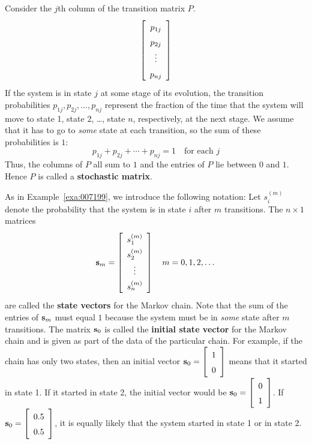 Consider the $j$th column of the transition matrix $P$.
\begin{equation*}
\leftB \begin{array}{c}
p_{1j} \\
p_{2j} \\
\vdots \\
p_{nj}
\end{array} \rightB
\end{equation*}
If the system is in state $j$ at some stage of its evolution, the transition probabilities $p_{1j}, p_{2j}, \dots, p_{nj}$ represent the fraction of the time that the system will move to state 1, state 2, \dots, state $n$, respectively, at the next stage. We assume that it has to go to \textit{some} state at each transition, so the sum of these probabilities is $1$:
\begin{equation*}
p_{1j} + p_{2j} + \cdots + p_{nj} = 1 \quad \mbox{for each } j
\end{equation*}
Thus, the columns of $P$ all sum to $1$ and the entries of $P$ lie between $0$ and $1$. Hence $P$ is called a \textbf{stochastic matrix}.


As in Example~\ref{exa:007199}, we introduce the following notation: Let $s_{i}^{(m)}$ denote the probability that the system is in state $i$ after $m$ transitions. The $n \times 1$ matrices
\begin{equation*}
\vect{s}_m = \leftB \def\arraystretch{1.5}\begin{array}{c}
s_{1}^{(m)} \\
s_{2}^{(m)} \\
\vdots \\
s_{n}^{(m)} 
\end{array} \rightB \quad m = 0, 1, 2, \dots
\end{equation*}
are called the \textbf{state vectors} for the Markov chain. Note that the sum of the entries of $\textbf{s}_{m}$ must equal $1$ because the system must be in \textit{some} state after $m$ transitions. The matrix $\textbf{s}_{0}$ is called the \textbf{initial state vector} for the Markov chain and is given as part of the data of the particular chain. For example, if the chain has only two states, then an initial vector $\vect{s}_0 = \leftB \begin{array}{c}
1 \\
0
\end{array} \rightB$
 means that it started in state 1. If it started in state 2, the initial vector would be $\vect{s}_0 = \leftB \begin{array}{c}
 0 \\
 1
 \end{array} \rightB$.
 If $\vect{s}_0 = \leftB \begin{array}{c}
 0.5 \\
 0.5
 \end{array} \rightB$, it is equally likely that the system started in state 1 or in state 2.



